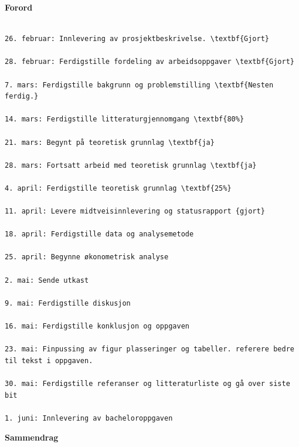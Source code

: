 \documentclass[
  12pt,
  a4paper,
  DIV=11,
  numbers=noendperiod]{scrartcl}
\renewcommand*\contentsname{Table of contents}
\newcommand\contentsname{Table of contents}
\begin{document}





\thispagestyle{plain}
\begin{center}
    \Large
    \textbf{Forord}
\end{center}


\begin{verbatim}

26. februar: Innlevering av prosjektbeskrivelse. \textbf{Gjort}

28. februar: Ferdigstille fordeling av arbeidsoppgaver \textbf{Gjort}

7. mars: Ferdigstille bakgrunn og problemstilling \textbf{Nesten ferdig.}

14. mars: Ferdigstille litteraturgjennomgang \textbf{80%}

21. mars: Begynt på teoretisk grunnlag \textbf{ja}

28. mars: Fortsatt arbeid med teoretisk grunnlag \textbf{ja}

4. april: Ferdigstille teoretisk grunnlag \textbf{25%}

11. april: Levere midtveisinnlevering og statusrapport {gjort}

18. april: Ferdigstille data og analysemetode

25. april: Begynne økonometrisk analyse 

2. mai: Sende utkast

9. mai: Ferdigstille diskusjon

16. mai: Ferdigstille konklusjon og oppgaven

23. mai: Finpussing av figur plasseringer og tabeller. referere bedre til tekst i oppgaven.

30. mai: Ferdigstille referanser og litteraturliste og gå over siste bit

1. juni: Innlevering av bacheloroppgaven

\end{verbatim}


\newpage
\hypersetup{linkcolor=black}
\renewcommand{\contentsname}{Innholdsfortegnelse}
\renewcommand*{\figureautorefname}{Figur}
\renewcommand*{\tableautorefname}{Tabell}
\tableofcontents
\listoffigures
\listoftables
\hypersetup{linkcolor=blue}
\newpage

\thispagestyle{plain}
\begin{center}
    \Large
    \textbf{Sammendrag}
\end{center}
\end{document}
